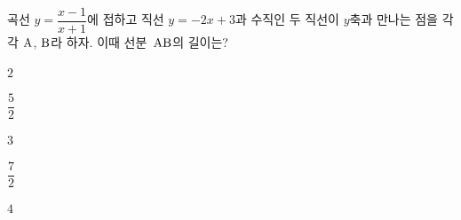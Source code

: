 곡선 $y=\dfrac{x-1}{x+1}$에 접하고 직선 $y=-2x+3$과 수직인 두 직선이 $y$축과 만나는 점을 각각 $\mathrm{A}$, $\mathrm{B}$라 하자. 이때 선분~$\mathrm{AB}$의 길이는?
\begin{choices32}{\rule[-3ex]{0pt}{8ex}$2$}{\rule[-3ex]{0pt}{8ex}$\dfrac{5}{2}$}{\rule[-3ex]{0pt}{8ex}$3$}{\rule[-3ex]{0pt}{8ex}$\dfrac{7}{2}$}{\rule[-3ex]{0pt}{8ex}$4$}\end{choices32}
